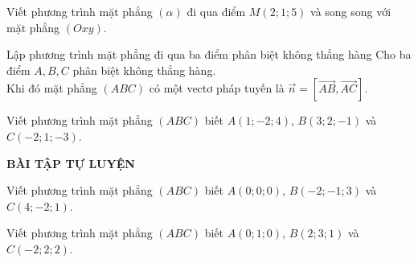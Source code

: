 \begin{bt}%
    Viết phương trình mặt phẳng $(\alpha)$ đi qua điểm $M\left(2;1;5\right)$ và song song với mặt phẳng $(Oxy)$.
\end{bt}

\begin{dang}{Lập phương trình mặt phẳng đi qua ba điểm phân biệt không thẳng hàng}
   Cho ba điểm $A,B,C$ phân biệt không thẳng hàng.\\
   Khi đó mặt phẳng $(ABC)$ có một vectơ pháp tuyến là $\overrightarrow{n}=\left[\overrightarrow{AB},\overrightarrow{AC}\right]$.
\end{dang}

\begin{vd}%
Viết phương trình mặt phẳng $\left(ABC\right)$ biết $A\left(1;-2;4\right)$, $B\left(3;2;-1\right)$ và $C\left(-2;1;-3\right)$.
\end{vd}
\begin{center}
    \textbf{BÀI TẬP TỰ LUYỆN}
\end{center}
\begin{bt}%
Viết phương trình mặt phẳng $\left(ABC\right)$ biết $A\left(0;0;0\right)$, $B\left(-2;-1;3\right)$ và $C\left(4;-2;1\right)$.
\end{bt}

\begin{bt}%
Viết phương trình mặt phẳng $\left(ABC\right)$ biết $A\left(0;1;0\right)$, $B\left(2;3;1\right)$ và $C\left(-2;2;2\right)$.
\end{bt}

